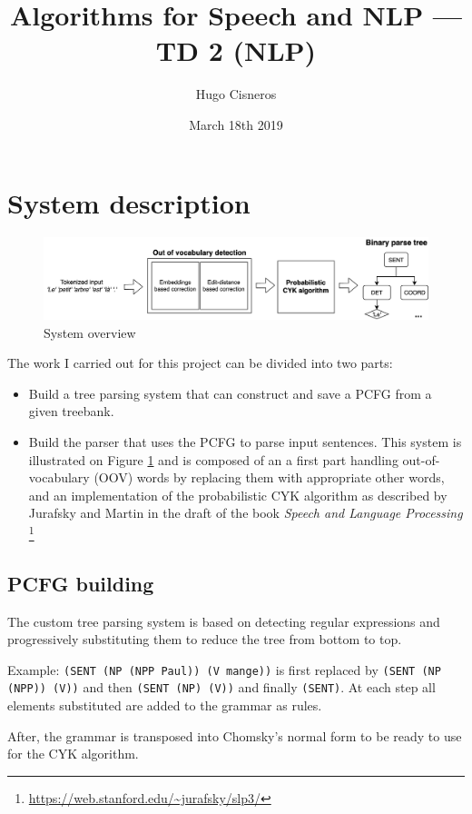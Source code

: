 \documentclass[11pt]{article}
\title{Algorithms for Speech and NLP --- TD 2 (NLP)}
\author{Hugo Cisneros}
\date{March 18th 2019}
\begin{document}
    \maketitle
    \section{System description}
    \begin{figure}[h]
        \centering
        \includegraphics[width=.9\linewidth]{system.png}
        \caption{System overview}
        \label{fig:sys}
    \end{figure}
    The work I carried out for this project can be divided into two parts:
    \begin{itemize}
        \item Build a tree parsing system that can construct and save a PCFG 
        from a given treebank.
        \item Build the parser that uses the PCFG to parse input sentences. This 
        system is illustrated on Figure \ref{fig:sys} and is composed of an 
        a first part handling out-of-vocabulary (OOV) words by replacing them 
        with appropriate other words, and an implementation of the probabilistic
        CYK algorithm as described by Jurafsky and Martin in the draft of the 
        book \textit{Speech and Language Processing}
        \footnote{\url{https://web.stanford.edu/~jurafsky/slp3/}}
    \end{itemize}

    \subsection{PCFG building}
    The custom tree parsing system is based on detecting regular expressions and
    progressively substituting them to reduce the tree from bottom to top. 
    
    Example: \texttt{(SENT (NP (NPP Paul)) (V mange))} is first replaced by 
    \texttt{(SENT (NP (NPP)) (V))} and then \texttt{(SENT (NP) (V))} and finally
    \texttt{(SENT)}. At each step all elements substituted are added to the 
    grammar as rules.

    After, the grammar is transposed into Chomsky's normal form to be ready to
    use for the CYK algorithm. 
\end{document}
